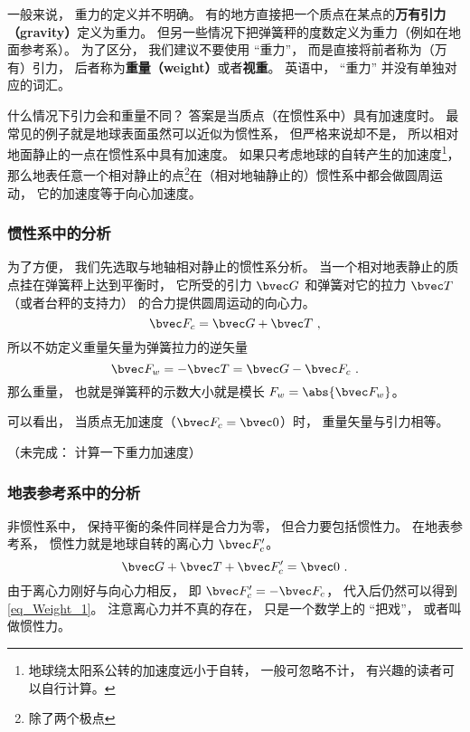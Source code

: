 

一般来说， 重力的定义并不明确。 有的地方直接把一个质点在某点的\textbf{万有引力（gravity）}定义为重力。 但另一些情况下把弹簧秤的度数定义为重力（例如在地面参考系）。 为了区分， 我们建议不要使用 “重力”， 而是直接将前者称为（万有）引力， 后者称为\textbf{重量（weight）}或者\textbf{视重}。 英语中， “重力” 并没有单独对应的词汇。

什么情况下引力会和重量不同？ 答案是当质点（在惯性系中）具有加速度时。 最常见的例子就是地球表面虽然可以近似为惯性系， 但严格来说却不是， 所以相对地面静止的一点在惯性系中具有加速度。 如果只考虑地球的自转产生的加速度\footnote{地球绕太阳系公转的加速度远小于自转， 一般可忽略不计， 有兴趣的读者可以自行计算。}， 那么地表任意一个相对静止的点\footnote{除了两个极点}在（相对地轴静止的）惯性系中都会做圆周运动， 它的加速度等于向心加速度。

\subsubsection{惯性系中的分析}
为了方便， 我们先选取与地轴相对静止的惯性系分析。 当一个相对地表静止的质点挂在弹簧秤上达到平衡时， 它所受的引力 $\bvec G$ 和弹簧对它的拉力 $\bvec T$（或者台秤的支持力） 的合力提供圆周运动的向心力。
\begin{equation}\label{eq_Weight_1}
\bvec F_c = \bvec G + \bvec T~,
\end{equation}
所以不妨定义重量矢量为弹簧拉力的逆矢量
\begin{equation}
\bvec F_w = -\bvec T = \bvec G - \bvec F_c~.
\end{equation}
那么重量， 也就是弹簧秤的示数大小就是模长 $F_w = \abs{\bvec F_w}$。

可以看出， 当质点无加速度（$\bvec F_c = \bvec 0$）时， 重量矢量与引力相等。

（未完成： 计算一下重力加速度）

\subsubsection{地表参考系中的分析}
非惯性系中， 保持平衡的条件同样是合力为零， 但合力要包括惯性力。 在地表参考系， 惯性力就是地球自转的离心力 $\bvec F'_c$。
\begin{equation}
\bvec G + \bvec T + \bvec F'_c = \bvec 0~.
\end{equation}
由于离心力刚好与向心力相反， 即 $\bvec F'_c = -\bvec F_c$， 代入后仍然可以得到\autoref{eq_Weight_1}。 注意离心力并不真的存在， 只是一个数学上的 “把戏”， 或者叫做惯性力。
